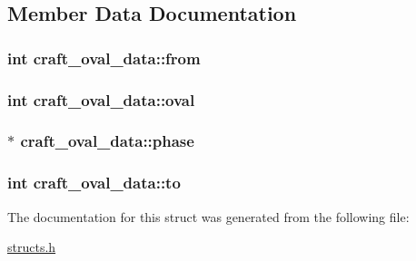 \subsection{Member Data Documentation}
\hypertarget{structcraft__oval__data_a0ec182de9ea4e17a26deb92c6f745b48}{
\subsubsection[{from}]{\setlength{\rightskip}{0pt plus 5cm}int craft\-\_\-oval\-\_\-data\-::from}}\label{structcraft__oval__data_a0ec182de9ea4e17a26deb92c6f745b48}
\hypertarget{structcraft__oval__data_a067c353bf4cecbdf85c47dcb8064a8e7}{
\subsubsection[{oval}]{\setlength{\rightskip}{0pt plus 5cm}int craft\-\_\-oval\-\_\-data\-::oval}}\label{structcraft__oval__data_a067c353bf4cecbdf85c47dcb8064a8e7}
\hypertarget{structcraft__oval__data_a01211725720787294fae38e5878c7843}{
\subsubsection[{phase}]{$\ast$ craft\-\_\-oval\-\_\-data\-::phase}}\label{structcraft__oval__data_a01211725720787294fae38e5878c7843}
\hypertarget{structcraft__oval__data_af57864756ca7e54ebf24ad0ccd8b3a76}{
\subsubsection[{to}]{\setlength{\rightskip}{0pt plus 5cm}int craft\-\_\-oval\-\_\-data\-::to}}\label{structcraft__oval__data_af57864756ca7e54ebf24ad0ccd8b3a76}


The documentation for this struct was generated from the following file\-:\begin{DoxyCompactItemize}
\item 
\hyperlink{structs_8h}{structs.\-h}\end{DoxyCompactItemize}
